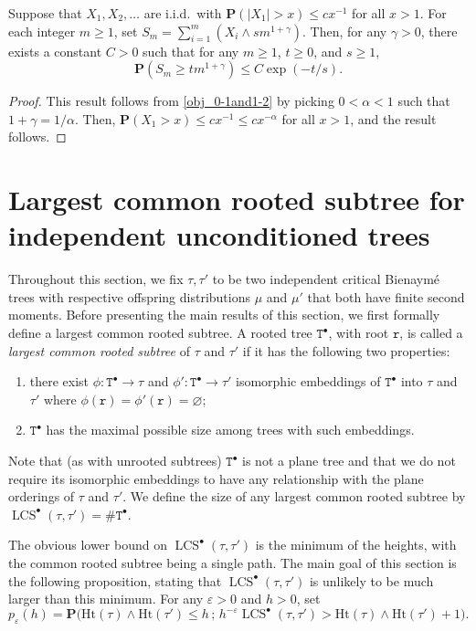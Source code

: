 \documentclass[11pt,reqno]{amsart}
\renewcommand{\P}{\mathbf{P}}
\newcommand{\1}{\mathbf{1}}
\newcommand{\0}{\mathbf{0}}
\newcommand{\ttT}{\mathtt{T}}
\newcommand{\ttr}{\mathtt{r}}
\newcommand{\Ht}{\mathrm{Ht}}
\newcommand{\LCS}{\operatorname{LCS}}
\newcommand{\eps}{\varepsilon}
\renewcommand{\emptyset}{\varnothing}
\begin{document}
\begin{cor}
\label{obj_1}
Suppose that $X_1,X_2,\dots$ are i.i.d.\ with $\P(|X_1|>x)\le c x^{-1}$ for all $x>1$. For each integer $m\geq 1$, set $S_m=\sum_{i=1}^m (X_i\wedge sm^{1+\gamma})$. Then, for any $\gamma>0$, there exists a constant $C>0$ such that for any $m\ge 1$, $t\ge 0$, and $s\geq 1$,
\[\P(S_m\ge t m^{1+\gamma})\le C \exp(-t/s ) .\]
\end{cor}

\begin{proof}
This result follows from \cref{obj_0-1and1-2} by picking $0<\alpha<1$ such that $1+\gamma=1/\alpha$. Then, $\P(X_1>x)\le cx^{-1}\le c x^{-\alpha}$ for all $x>1$, and the result follows. 
\end{proof}



\section{Largest common rooted subtree for independent unconditioned trees}
\label{sec:LCS_rooted_unconditioned}



Throughout this section, we fix $\tau,\tau'$ to be two independent critical Bienaymé trees with respective offspring distributions $\mu$ and $\mu'$ that both have finite second moments.
Before presenting the main results of this section, we first formally define a largest common rooted subtree.
A rooted tree $\ttT^\bullet$, with root $\ttr$, is called a \emph{largest common rooted subtree} of $\tau$ and $\tau'$ if it has the following two properties:
\begin{enumerate}
\item[(a)] there exist $\phi:\ttT^\bullet\rightarrow \tau$ and $\phi':\ttT^\bullet\rightarrow \tau'$ isomorphic embeddings of $\ttT^\bullet$ into $\tau$ and $\tau'$ where $\phi(\ttr) = \phi'(\ttr) = \emptyset$;
\item[(b)] $\ttT^\bullet$ has the maximal possible size among trees with such embeddings.
\end{enumerate}
Note that (as with unrooted subtrees) $\ttT^\bullet$ is not a plane tree and that we do not require its isomorphic embeddings to have any relationship with the plane orderings of $\tau$ and $\tau'$.
We define the size of any largest common rooted subtree by $\LCS^\bullet(\tau,\tau') = \#\ttT^\bullet$.

The obvious lower bound on $\LCS^\bullet(\tau,\tau')$ is the minimum of the heights, with the common rooted subtree being a single path.
The main goal of this section is the following proposition, stating that $\LCS^\bullet(\tau,\tau')$ is unlikely to be much larger than this minimum.
For any $\eps > 0$ and $h >0$, set
\begin{equation}\label{eq:p-eps}
p_{\eps}(h)= \P\Big(\Ht(\tau)\wedge\Ht(\tau')\leq h\, ;\, h^{-\varepsilon}\LCS^\bullet(\tau,\tau')> \Ht(\tau)\wedge\Ht(\tau') +1 \Big).
\end{equation}
\end{document}
